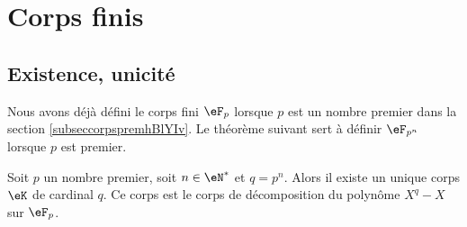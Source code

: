 \section{Corps finis}
\label{SecCorpsFinizkAcbS}

\subsection{Existence, unicité}

Nous avons déjà défini le corps fini \( \eF_p\) lorsque \( p\) est un nombre premier dans la section \ref{subseccorpspremhBlYIv}. Le théorème suivant sert à définir \( \eF_{p^n}\) lorsque \( p\) est premier.
\begin{theorem}     \label{ThoOzgSfy}
    Soit \( p\) un nombre premier, soit \( n\in \eN^*\) et \( q=p^n\). Alors il existe un unique corps \( \eK\) de cardinal \( q\). Ce corps est le corps de décomposition du polynôme \( X^q-X\) sur \( \eF_p\).
\end{theorem}

